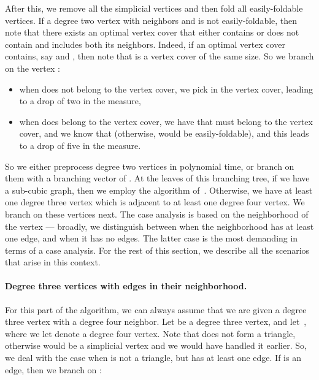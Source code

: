 \documentclass[svgnames]{llncs}
\newcommand{\branchvector}[1]{{\color{IndianRed}{}}}
\begin{document}
\longversion{



}


After this, we remove all the simplicial vertices and then fold all easily-foldable vertices. If a degree two vertex  with neighbors  and  is not easily-foldable,
then note that there exists an optimal vertex cover that either contains  or does not contain  and includes both its neighbors. 
Indeed, if an optimal vertex cover  contains, say  and , then note that  is a vertex cover of the same size. So we branch on the vertex :

\begin{itemize}
\item when  does not belong to the vertex cover, we pick  in the vertex cover, leading to a drop of two in the measure,
\item when  does belong to the vertex cover, we have that  must belong to the vertex cover,
and we know that  (otherwise,  would be easily-foldable), and this leads to a drop of five in the measure. 
\end{itemize}

So we either preprocess degree two vertices in polynomial time, or branch on them with a branching vector of \branchvector{2,5}. At the leaves of this branching tree, if we have a sub-cubic graph,
then we employ the algorithm of~\cite{X10}. Otherwise, we have at least one degree three vertex which is adjacent to at least one degree four vertex. 
We branch on these vertices next. The case analysis is based on the neighborhood of the vertex --- broadly, we distinguish between when the neighborhood  
has at least one edge, and when it has no edges. The latter case is the most demanding in terms of a case analysis. For the rest of this section, we describe all the scenarios that arise in this context.






\paragraph{Degree three vertices with edges in their neighborhood.}

For this part of the algorithm, we can always assume that we are given a degree three vertex with a degree four neighbor. 
Let  be a degree three vertex, and let~, where we let  denote a degree four vertex.
Note that  does not form a triangle, otherwise  would be a simplicial vertex and we would have handled it earlier.
So, we deal with the case when  is not a triangle, but has at least one edge. If  is an edge, then we branch on :
\end{document}

